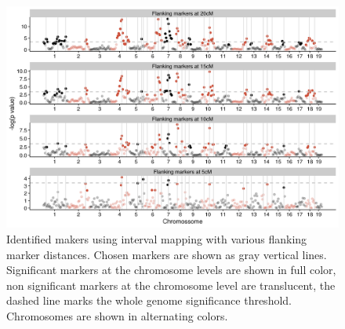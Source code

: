 \begin{refsection}
\begin{figure}
\includegraphics[width=\linewidth]{chapter_JoH-Melo_etal/media/growth_manhattan.png}
\caption[Mapped markers]{Identified makers using interval mapping with various
flanking marker distances. Chosen markers are shown as gray vertical
lines. Significant markers at the chromosome levels are shown in full
color, non significant markers at the chromosome level are translucent,
the dashed line marks the whole genome significance threshold.
Chromosomes are shown in alternating
colors.}
\label{fig:joh:manhatan}
\end{figure}


\end{refsection}
